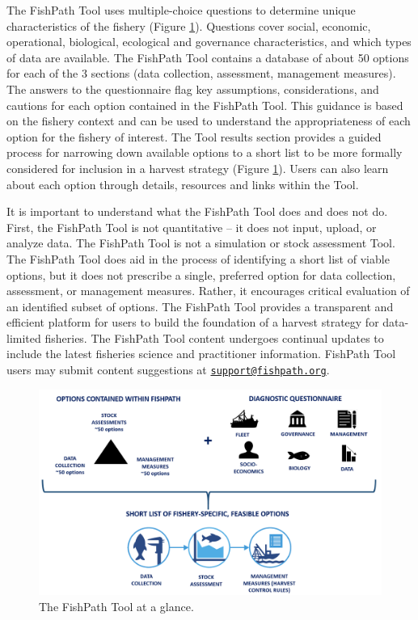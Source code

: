 \documentclass[
  11pt,
]{book}
\begin{document}
The FishPath Tool uses multiple-choice questions to determine unique characteristics of the fishery (Figure \ref{fig:overview}). Questions cover social, economic, operational, biological, ecological and governance characteristics, and which types of data are available. The FishPath Tool contains a database of about 50 options for each of the 3 sections (data collection, assessment, management measures). The answers to the questionnaire flag key assumptions, considerations, and cautions for each option contained in the FishPath Tool. This guidance is based on the fishery context and can be used to understand the appropriateness of each option for the fishery of interest. The Tool results section provides a guided process for narrowing down available options to a short list to be more formally considered for inclusion in a harvest strategy (Figure \ref{fig:overview}). Users can also learn about each option through details, resources and links within the Tool.

It is important to understand what the FishPath Tool does and does not do. First, the FishPath Tool is not quantitative -- it does not input, upload, or analyze data. The FishPath Tool is not a simulation or stock assessment Tool. The FishPath Tool does aid in the process of identifying a short list of viable options, but it does not prescribe a single, preferred option for data collection, assessment, or management measures. Rather, it encourages critical evaluation of an identified subset of options. The FishPath Tool provides a transparent and efficient platform for users to build the foundation of a harvest strategy for data-limited fisheries. The FishPath Tool content undergoes continual updates to include the latest fisheries science and practitioner information. FishPath Tool users may submit content suggestions at \href{mailto:support@fishpath.org}{\nolinkurl{support@fishpath.org}}.

\begin{figure}

{\centering \includegraphics[width=0.75\linewidth]{images/fishpath-tool-overview-diagram} 

}

\caption{The FishPath Tool at a glance.}\label{fig:overview}
\end{figure}
\end{document}
